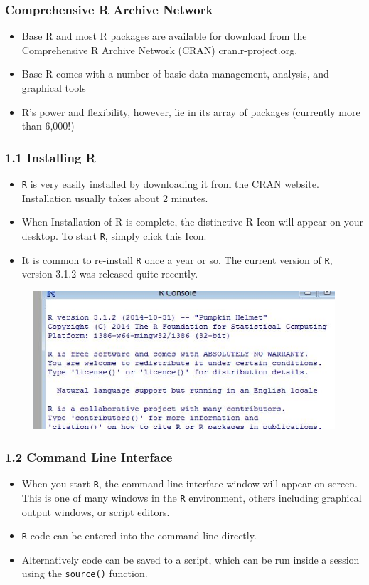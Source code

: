 \documentclass{beamer}
\begin{document}
 \frametitle{Comprehensive R Archive Network}
 \begin{itemize}
 \item Base R and most R packages are available for download from the Comprehensive R Archive Network
 (CRAN) cran.r-project.org. 
 \item Base R comes with a number of basic data management,
 analysis, and graphical tools 
 \item R’s power and flexibility, however, lie in its array of packages
 (currently more than 6,000!)
 \end{itemize}
 
 
 
 \frametitle{1.1 Installing R}
 \begin{itemize}
 \item \texttt{R} is very easily installed by downloading it from the CRAN website. Installation usually takes
 about 2 minutes. 
 \item When Installation of R is complete, the distinctive R Icon will appear on your
 desktop. To start \texttt{R}, simply click this Icon. 
 \item It is common to re-install \texttt{R} once a year or so. The
 current version of \texttt{R}, version 3.1.2 was released quite recently.
 \end{itemize}
 
 
 
 
 
 \begin{figure}
 \centering
 \includegraphics[width=0.7\linewidth]{images/Rversion}        
 \end{figure}
   
 
 
 \frametitle{1.2 Command Line Interface}
 \begin{itemize}
 \item When you start \texttt{R}, the command line interface window will appear on screen. This is one
 of many windows in the \texttt{R} environment, others including graphical output windows, or script
 editors. 
 \item \texttt{R} code can be entered into the command line directly. 
 \item Alternatively code can be saved
 to a script, which can be run inside a session using the \texttt{source()} function.
 \end{itemize}
 
\end{document}
